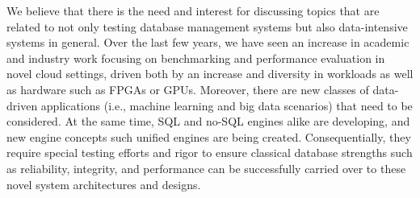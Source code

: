 \documentclass[sigconf]{acmart}
\begin{document}
We believe that there is the need and interest for discussing topics that are related to not only testing
database management systems but also data-intensive systems in general. Over the last few years, we
have seen an increase in academic and industry work focusing on benchmarking and performance
evaluation in novel cloud settings, driven both by an increase and diversity in workloads as well as
hardware such as FPGAs or GPUs. Moreover, there are new classes of data-driven applications (i.e.,
machine learning and big data scenarios) that need to be considered. At the same time, SQL and no-SQL
engines alike are developing, and new engine concepts such unified engines are being created.
Consequentially, they require special testing efforts and rigor to ensure classical database strengths such
as reliability, integrity, and performance can be successfully carried over to these novel system
architectures and designs.
\end{document}

